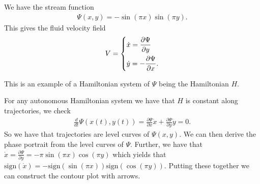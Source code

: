 \begin{ex}
We have the stream function
\begin{align}
	\Psi(x,y) = -\sin(\pi x) \sin(\pi y).
\end{align}
This gives the fluid velocity field
\begin{align}
	V = 
	\begin{dcases}
		\dot{x} = \frac{\partial \Psi}{\partial y} \\
		\dot{y} = - \frac{\partial \Psi}{\partial x}.
	\end{dcases}
\end{align}
\begin{remark}[]
This is an example of a Hamiltonian system of $\Psi$ being the Hamiltonian $H$.
\end{remark}
For any autonomous Hamiltonian system we have that $H$ is constant along trajectories, we check
\begin{align}
	\frac{d}{dt}\Psi(x(t),y(t)) = \frac{\partial \Psi}{\partial x}\dot{x} + \frac{\partial \Psi}{\partial y}\dot{y} = 0.
\end{align}
So we have that trajectories are level curves of $\Psi(x,y)$. We can then derive the phase portrait from the level curves of $\Psi$. Further, we have that $\dot{x} = \frac{\partial \Psi}{\partial y} = - \pi \sin(\pi x) \cos(\pi y)$ which yields that $ \textrm{sign} (\dot{x}) = -  \textrm{sign} (\sin(\pi x))  \textrm{sign} (\cos(\pi y))$. Putting these together we can construct the contour plot with arrows.


\end{ex}
